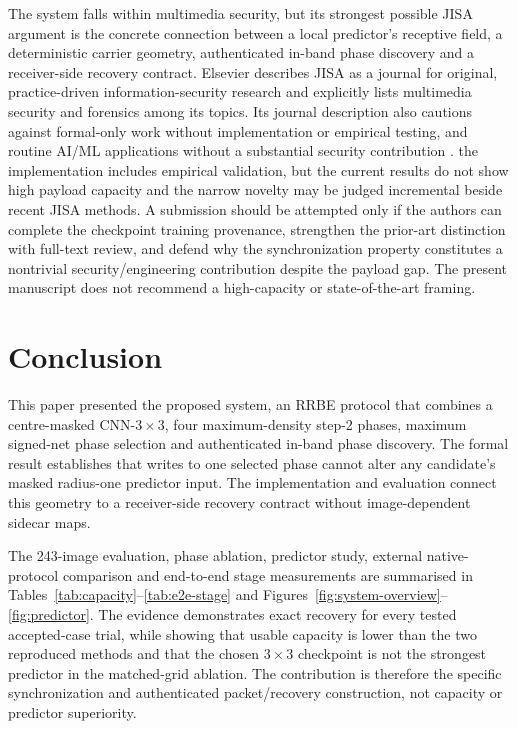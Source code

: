 \documentclass[preprint,12pt,a4paper]{elsarticle}
\begin{document}
The system falls within multimedia security, but its strongest possible JISA argument is the concrete connection between a local predictor's receptive field, a deterministic carrier geometry, authenticated in-band phase discovery and a receiver-side recovery contract. Elsevier describes JISA as a journal for original, practice-driven information-security research and explicitly lists multimedia security and forensics among its topics. Its journal description also cautions against formal-only work without implementation or empirical testing, and routine AI/ML applications without a substantial security contribution \cite{jisaScope}. the implementation includes empirical validation, but the current results do not show high payload capacity and the narrow novelty may be judged incremental beside recent JISA methods. A submission should be attempted only if the authors can complete the checkpoint training provenance, strengthen the prior-art distinction with full-text review, and defend why the synchronization property constitutes a nontrivial security/engineering contribution despite the payload gap. The present manuscript does not recommend a high-capacity or state-of-the-art framing.

\section{Conclusion}
\label{sec:conclusion}

This paper presented the proposed system, an RRBE protocol that combines a centre-masked CNN-$3\times3$, four maximum-density step-2 phases, maximum signed-net phase selection and authenticated in-band phase discovery. The formal result establishes that writes to one selected phase cannot alter any candidate's masked radius-one predictor input. The implementation and evaluation connect this geometry to a receiver-side recovery contract without image-dependent sidecar maps.

The 243-image evaluation, phase ablation, predictor study, external native-protocol comparison and end-to-end stage measurements are summarised in Tables~\ref{tab:capacity}--\ref{tab:e2e-stage} and Figures~\ref{fig:system-overview}--\ref{fig:predictor}. The evidence demonstrates exact recovery for every tested accepted-case trial, while showing that usable capacity is lower than the two reproduced methods and that the chosen $3\times3$ checkpoint is not the strongest predictor in the matched-grid ablation. The contribution is therefore the specific synchronization and authenticated packet/recovery construction, not capacity or predictor superiority.
\end{document}

